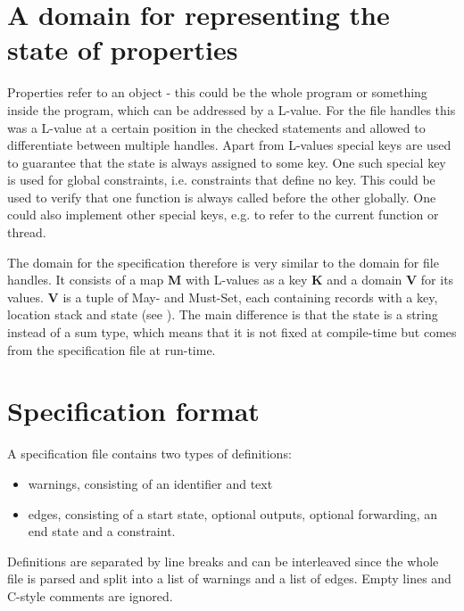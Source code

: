 \section{A domain for representing the state of properties}
Properties refer to an object - this could be the whole program or something inside the program, which can be addressed by a L-value. For the file handles this was a L-value at a certain position in the checked statements and allowed to differentiate between multiple handles.
Apart from L-values special keys are used to guarantee that the state is always assigned to some key.
One such special key is used for global constraints, i.e. constraints that define no key. This could be used to verify that one function is always called before the other globally. One could also implement other special keys, e.g. to refer to the current function or thread.

The domain for the specification therefore is very similar to the domain for file handles. It consists of a map \textbf{M} with L-values as a key \textbf{K} and a domain \textbf{V} for its values. \textbf{V} is a tuple of May- and Must-Set, each containing records with a key, location stack and state (see ).
The main difference is that the state is a string instead of a sum type, which means that it is not fixed at compile-time but comes from the specification file at run-time.


\section{Specification format}
A specification file contains two types of definitions:
\begin{itemize}
\item warnings, consisting of an identifier and text
\item edges, consisting of a start state, optional outputs, optional forwarding, an end state and a constraint.
\end{itemize}
Definitions are separated by line breaks and can be interleaved since the whole file is parsed and split into a list of warnings and a list of edges. Empty lines and C-style comments are ignored.

